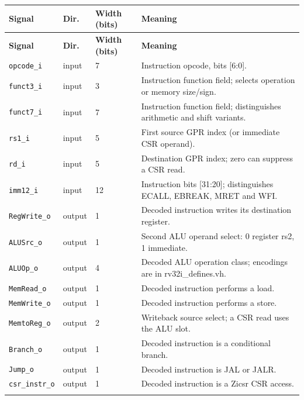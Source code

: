 \documentclass[11pt]{article}
\begin{document}
{\small
\begin{longtable}{@{}L{0.3400\dimexpr\linewidth-36pt\relax}L{0.1000\dimexpr\linewidth-36pt\relax}L{0.1000\dimexpr\linewidth-36pt\relax}L{0.4600\dimexpr\linewidth-36pt\relax}@{}}
\toprule
\textbf{Signal} & \textbf{Dir.} & \textbf{Width (bits)} & \textbf{Meaning} \\ \midrule
\endfirsthead
\toprule
\textbf{Signal} & \textbf{Dir.} & \textbf{Width (bits)} & \textbf{Meaning} \\ \midrule
\endhead
\texttt{opcode\_i} & input & 7 & Instruction opcode, bits [6:0]. \\ \addlinespace[3pt]
\texttt{funct3\_i} & input & 3 & Instruction function field; selects operation or memory size/sign. \\ \addlinespace[3pt]
\texttt{funct7\_i} & input & 7 & Instruction function field; distinguishes arithmetic and shift variants. \\ \addlinespace[3pt]
\texttt{rs1\_i} & input & 5 & First source GPR index (or immediate CSR operand). \\ \addlinespace[3pt]
\texttt{rd\_i} & input & 5 & Destination GPR index; zero can suppress a CSR read. \\ \addlinespace[3pt]
\texttt{imm12\_i} & input & 12 & Instruction bits [31:20]; distinguishes ECALL, EBREAK, MRET and WFI. \\ \addlinespace[3pt]
\texttt{RegWrite\_o} & output & 1 & Decoded instruction writes its destination register. \\ \addlinespace[3pt]
\texttt{ALUSrc\_o} & output & 1 & Second ALU operand select: 0 register rs2, 1 immediate. \\ \addlinespace[3pt]
\texttt{ALUOp\_o} & output & 4 & Decoded ALU operation class; encodings are in rv32i\_defines.vh. \\ \addlinespace[3pt]
\texttt{MemRead\_o} & output & 1 & Decoded instruction performs a load. \\ \addlinespace[3pt]
\texttt{MemWrite\_o} & output & 1 & Decoded instruction performs a store. \\ \addlinespace[3pt]
\texttt{MemtoReg\_o} & output & 2 & Writeback source select; a CSR read uses the ALU slot. \\ \addlinespace[3pt]
\texttt{Branch\_o} & output & 1 & Decoded instruction is a conditional branch. \\ \addlinespace[3pt]
\texttt{Jump\_o} & output & 1 & Decoded instruction is JAL or JALR. \\ \addlinespace[3pt]
\texttt{csr\_instr\_o} & output & 1 & Decoded instruction is a Zicsr CSR access. \\ \addlinespace[3pt]

\end{longtable}}
\end{document}

